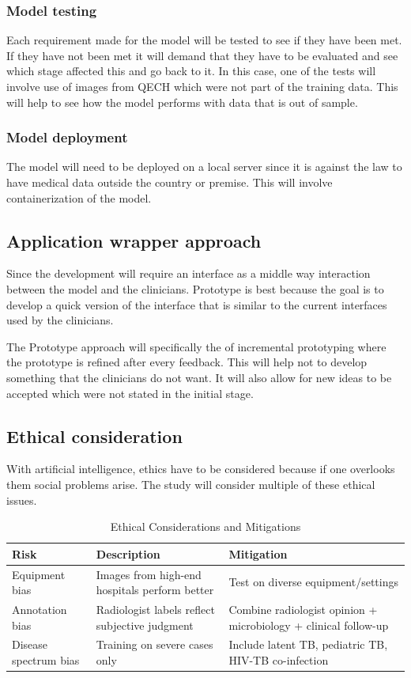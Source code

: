 \documentclass[12pt,a4paper]{article}
\begin{document}
\subsubsection{Model testing}
Each requirement made for the model will be tested to see if they have been met. If they have not been met it will demand that they have to be evaluated and see which stage affected this and go back to it. In this case, one of the tests will involve use of images from QECH which were not part of the training data. This will help to see how the model performs with data that is out of sample.  

\subsubsection{Model deployment}
The model will need to be deployed on a local server since it is against the law to have medical data outside the country or premise. This will involve containerization of the model.

\subsection{Application wrapper approach}
Since the development will require an interface as a middle way interaction between the model and the clinicians. Prototype is best because the goal is to develop a quick version of the interface that is similar to the current interfaces used by the clinicians.

The Prototype approach will specifically the of incremental prototyping where the prototype is refined after every feedback. This will help not to develop something that the clinicians do not want. It will also allow for new ideas to be accepted which were not stated in the initial stage. 

\subsection{Ethical consideration}
With artificial intelligence, ethics have to be considered because if one overlooks them social problems arise. The study will consider multiple of these ethical issues.

\begin{table}[htbp]
    \centering
    \begin{tabular}{lll}
        \toprule
        \textbf{Risk} & \textbf{Description} & \textbf{Mitigation} \\
        \midrule
        Equipment bias & Images from high-end hospitals perform better & Test on diverse equipment/settings \\
        Annotation bias & Radiologist labels reflect subjective judgment & Combine radiologist opinion + microbiology + clinical follow-up \\
        Disease spectrum bias & Training on severe cases only & Include latent TB, pediatric TB, HIV-TB co-infection \\
        \bottomrule
    \end{tabular}
    \caption{Ethical Considerations and Mitigations}
\end{table}
\end{document}
